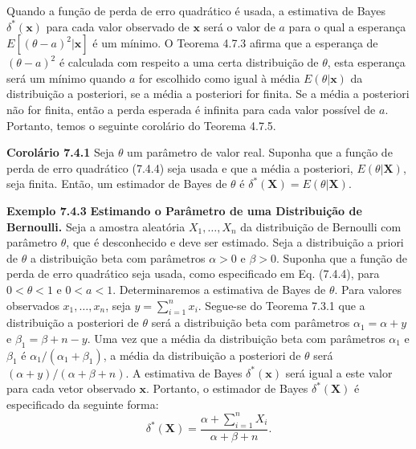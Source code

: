 \vspace{1cm}
Quando a função de perda de erro quadrático é usada, a estimativa de Bayes $\delta^*(\mathbf{x})$ para cada valor observado de $\mathbf{x}$ será o valor de $a$ para o qual a esperança $E[(\theta-a)^2|\mathbf{x}]$ é um mínimo. O Teorema 4.7.3 afirma que a esperança de $(\theta-a)^2$ é calculada com respeito a uma certa distribuição de $\theta$, esta esperança será um mínimo quando $a$ for escolhido como igual à média $E(\theta|\mathbf{x})$ da distribuição a posteriori, se a média a posteriori for finita. Se a média a posteriori não for finita, então a perda esperada é infinita para cada valor possível de $a$. Portanto, temos o seguinte corolário do Teorema 4.7.5.

\vspace{1cm}
\noindent\textbf{Corolário 7.4.1} \quad Seja $\theta$ um parâmetro de valor real. Suponha que a função de perda de erro quadrático (7.4.4) seja usada e que a média a posteriori, $E(\theta|\mathbf{X})$, seja finita. Então, um estimador de Bayes de $\theta$ é $\delta^*(\mathbf{X}) = E(\theta|\mathbf{X})$.

\vspace{1cm}
\noindent\textbf{Exemplo 7.4.3} \quad \textbf{Estimando o Parâmetro de uma Distribuição de Bernoulli.} Seja a amostra aleatória $X_1, \dots, X_n$ da distribuição de Bernoulli com parâmetro $\theta$, que é desconhecido e deve ser estimado. Seja a distribuição a priori de $\theta$ a distribuição beta com parâmetros $\alpha>0$ e $\beta>0$. Suponha que a função de perda de erro quadrático seja usada, como especificado em Eq. (7.4.4), para $0<\theta<1$ e $0<a<1$. Determinaremos a estimativa de Bayes de $\theta$.
Para valores observados $x_1, \dots, x_n$, seja $y=\sum_{i=1}^{n}x_i$. Segue-se do Teorema 7.3.1 que a distribuição a posteriori de $\theta$ será a distribuição beta com parâmetros $\alpha_1=\alpha+y$ e $\beta_1=\beta+n-y$. Uma vez que a média da distribuição beta com parâmetros $\alpha_1$ e $\beta_1$ é $\alpha_1/(\alpha_1+\beta_1)$, a média da distribuição a posteriori de $\theta$ será $(\alpha+y)/(\alpha+\beta+n)$. A estimativa de Bayes $\delta^*(\mathbf{x})$ será igual a este valor para cada vetor observado $\mathbf{x}$. Portanto, o estimador de Bayes $\delta^*(\mathbf{X})$ é especificado da seguinte forma:
\begin{equation}
\delta^*(\mathbf{X}) = \frac{\alpha+\sum_{i=1}^{n}X_i}{\alpha+\beta+n}. \tag{7.4.5}
\end{equation}

